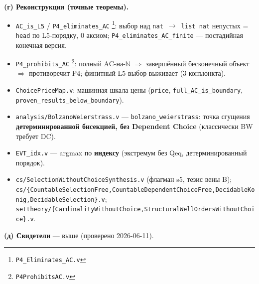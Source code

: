 \documentclass[11pt,a4paper]{article}
\begin{document}
\textbf{(г) Реконструкция (точные теоремы).}
\begin{itemize}
\item \texttt{AC\_\allowbreak{}is\_\allowbreak{}L5} / \texttt{P4\_\allowbreak{}eliminates\_\allowbreak{}AC} \footnote{\texttt{P4\_\allowbreak{}Eliminates\_\allowbreak{}AC.v}}: выбор над \texttt{nat $\to$ list nat} непустых = \texttt{head} по L5-порядку, 0 аксиом; \texttt{P4\_\allowbreak{}eliminates\_\allowbreak{}AC\_\allowbreak{}finite} --- постадийная конечная версия.
\item \texttt{P4\_\allowbreak{}prohibits\_\allowbreak{}AC} \footnote{\texttt{P4Prohibits\allowbreak{}AC.v}}: полный AC-на-$\mathbb{N}$ $\Longrightarrow$ завершённый бесконечный объект $\Longrightarrow$ противоречит P4; финитный L5-выбор выживает (3 конъюнкта).
\item \texttt{Choice\allowbreak{}Price\allowbreak{}Map.v}: машинная шкала цены (\texttt{price}, \texttt{full\_\allowbreak{}AC\_\allowbreak{}is\_\allowbreak{}boundary}, \texttt{proven\_\allowbreak{}results\_\allowbreak{}below\_\allowbreak{}boundary}).
\item \texttt{analysis/\allowbreak{}Bolzano\allowbreak{}Weierstrass.v} --- \texttt{bolzano\_\allowbreak{}weierstrass}: точка сгущения \textbf{детерминированной бисекцией, без Dependent Choice} (классически BW требует DC).
\item \texttt{EVT\_\allowbreak{}idx.v} --- argmax по \textbf{индексу} (экстремум без Qeq, детерминированный порядок).
\item \texttt{cs/\allowbreak{}Selection\allowbreak{}Without\allowbreak{}Choice\allowbreak{}Synthesis.v} (флагман s5, тезис вены B); \texttt{cs/\allowbreak{}\{Countable\allowbreak{}Selection\allowbreak{}Free,\allowbreak{}Countable\allowbreak{}Dependent\allowbreak{}Choice\allowbreak{}Free,\allowbreak{}Decidable\allowbreak{}Konig,\allowbreak{}Decidable\allowbreak{}Selection\}.v}; \texttt{settheory/\allowbreak{}\{Cardinality\allowbreak{}Without\allowbreak{}Choice,\allowbreak{}Structural\allowbreak{}Well\allowbreak{}Orders\allowbreak{}Without\allowbreak{}Choice\}.v}.
\end{itemize}

\textbf{(д) Свидетели} --- выше (проверено 2026-06-11).
\end{document}

